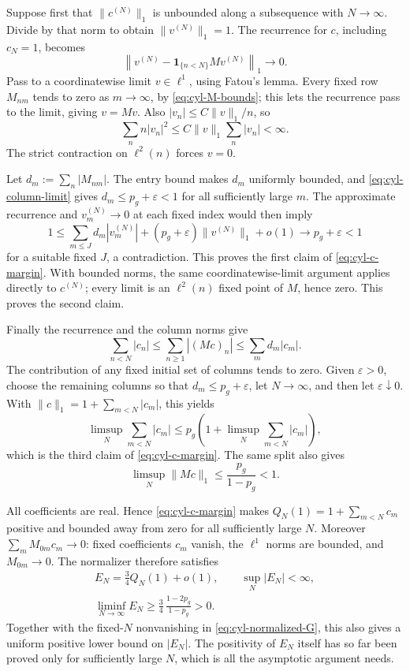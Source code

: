 Suppose first that \(\|c^{(N)}\|_1\) is unbounded along a subsequence
with \(N\to\infty\).
Divide by that norm to obtain \(\|v^{(N)}\|_1=1\).  The recurrence
for \(c\), including \(c_N=1\), becomes
\[
 \left\|v^{(N)}-\mathbf1_{\{n<N\}}Mv^{(N)}\right\|_1\longrightarrow0.
\]
Pass to a coordinatewise limit \(v\in\ell^1\), using Fatou's lemma.
Every fixed row
\(M_{nm}\) tends to zero as \(m\to\infty\), by
\eqref{eq:cyl-M-bounds}; this lets the recurrence pass to the limit,
giving \(v=Mv\).  Also \(|v_n|\le C\|v\|_1/n\), so
\[
 \sum_n n|v_n|^2\le C\|v\|_1\sum_n|v_n|<\infty.
\]
The strict contraction on \(\ell^2(n)\) forces \(v=0\).

Let \(d_m:=\sum_n|M_{nm}|\).  The entry bound makes \(d_m\) uniformly
bounded, and \eqref{eq:cyl-column-limit} gives
\(d_m\le p_g+\varepsilon<1\) for all sufficiently large \(m\).
The approximate recurrence and \(v_m^{(N)}\to0\) at each fixed index
would then imply
\[
 1\le \sum_{m\le J}d_m|v_m^{(N)}|
       +(p_g+\varepsilon)\|v^{(N)}\|_1+o(1)
 \longrightarrow p_g+\varepsilon<1
\]
for a suitable fixed \(J\), a contradiction.  This proves the first
claim of \eqref{eq:cyl-c-margin}.  With bounded norms, the same
coordinatewise-limit argument applies directly to \(c^{(N)}\);
every limit is an \(\ell^2(n)\) fixed point of \(M\), hence zero.
This proves the second claim.

Finally the recurrence and the column norms give
\[
 \sum_{n<N}|c_n|\le\sum_{n\ge1}|(Mc)_n|
                 \le\sum_m d_m|c_m|.
\]
The contribution of any fixed initial set of columns tends to zero.
Given \(\varepsilon>0\), choose the remaining columns so that
\(d_m\le p_g+\varepsilon\), let \(N\to\infty\), and then let
\(\varepsilon\downarrow0\).  With
\(\|c\|_1=1+\sum_{m<N}|c_m|\), this yields
\[
 \limsup_N\sum_{m<N}|c_m|
 \le p_g\left(1+\limsup_N\sum_{m<N}|c_m|\right),
\]
which is the third claim of \eqref{eq:cyl-c-margin}.  The same split
also gives
\[
 \limsup_N\|Mc\|_1\le\frac{p_g}{1-p_g}<1.
\]

All coefficients are real.  Hence \eqref{eq:cyl-c-margin} makes
\(Q_N(1)=1+\sum_{m<N}c_m\) positive and bounded away from zero for
all sufficiently large \(N\).  Moreover
\(\sum_mM_{0m}c_m\to0\): fixed coefficients \(c_m\) vanish, the
\(\ell^1\) norms are bounded, and \(M_{0m}\to0\).  The normalizer
therefore satisfies
\[
\begin{gathered}
 E_N=\frac34Q_N(1)+o(1),\qquad \sup_N|E_N|<\infty,\\
 \liminf_{N\to\infty}E_N
 \ge\frac34\,\frac{1-2p_g}{1-p_g}>0.
\end{gathered}
\]
Together with the fixed-\(N\) nonvanishing in
\eqref{eq:cyl-normalized-G}, this also gives a uniform positive lower
bound on \(|E_N|\).  The positivity of \(E_N\) itself has so far been
proved only for sufficiently large \(N\), which is all the
asymptotic argument needs.


